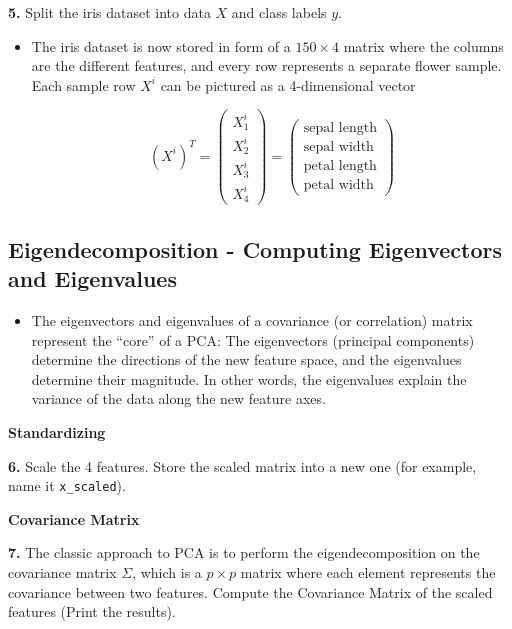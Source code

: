 \documentclass[]{book}
\newenvironment{rmdblock}[1]
  {\begin{shaded*}
  \begin{itemize}
  \renewcommand{\labelitemi}{
    \raisebox{-.7\height}[0pt][0pt]{
      {\setkeys{Gin}{width=2em,keepaspectratio}\texttt{[image: img/icons/\#1]}}
    }
  }
  \item
  }
  {
  \end{itemize}
  \end{shaded*}
  }
\newenvironment{rmdinsight}
  {\begin{rmdblock}{insight}}
  {\end{rmdblock}}
\begin{document}
\textbf{5.} Split the iris dataset into data \(X\) and class labels
\(y\).

\begin{rmdinsight}
The iris dataset is now stored in form of a \(150 \times 4\) matrix
where the columns are the different features, and every row represents a
separate flower sample. Each sample row \(X^i\) can be pictured as a
4-dimensional vector

\[ (X^i)^T = \begin{pmatrix} X_1^i \\ X_2^i \\ X_3^i \\ X_4^i \end{pmatrix}
= \begin{pmatrix} \text{sepal length} \\ \text{sepal width} \\\text{petal length} \\ \text{petal width} \end{pmatrix}\]
\end{rmdinsight}

\subsection*{Eigendecomposition - Computing Eigenvectors and
Eigenvalues}\label{eigendecomposition---computing-eigenvectors-and-eigenvalues}

\begin{rmdinsight}
The eigenvectors and eigenvalues of a covariance (or correlation) matrix
represent the ``core'' of a PCA: The eigenvectors (principal components)
determine the directions of the new feature space, and the eigenvalues
determine their magnitude. In other words, the eigenvalues explain the
variance of the data along the new feature axes.
\end{rmdinsight}

\textbf{Standardizing}

\textbf{6.} Scale the 4 features. Store the scaled matrix into a new one
(for example, name it \texttt{x\_scaled}).

\textbf{Covariance Matrix}

\textbf{7.} The classic approach to PCA is to perform the
eigendecomposition on the covariance matrix \(\Sigma\), which is a
\(p\times p\) matrix where each element represents the covariance
between two features. Compute the Covariance Matrix of the scaled
features (Print the results).
\end{document}
